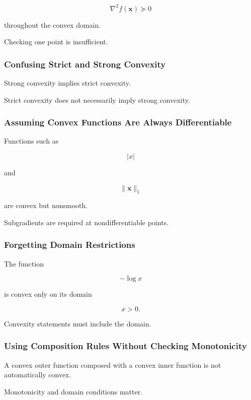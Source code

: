\[
\boxed{
\nabla^2f(\mathbf{x})
\succeq0
}
\]

throughout the convex domain.

Checking one point is insufficient.

\subsubsection{Confusing Strict and Strong Convexity}

Strong convexity implies strict convexity.

Strict convexity does not necessarily imply strong convexity.

\subsubsection{Assuming Convex Functions Are Always Differentiable}

Functions such as

\[
|x|
\]

and

\[
\|\mathbf{x}\|_1
\]

are convex but nonsmooth.

Subgradients are required at nondifferentiable points.

\subsubsection{Forgetting Domain Restrictions}

The function

\[
-\log x
\]

is convex only on its domain

\[
\boxed{
x>0.
}
\]

Convexity statements must include the domain.

\subsubsection{Using Composition Rules Without Checking Monotonicity}

A convex outer function composed with a convex inner function is not
automatically convex.

Monotonicity and domain conditions matter.


